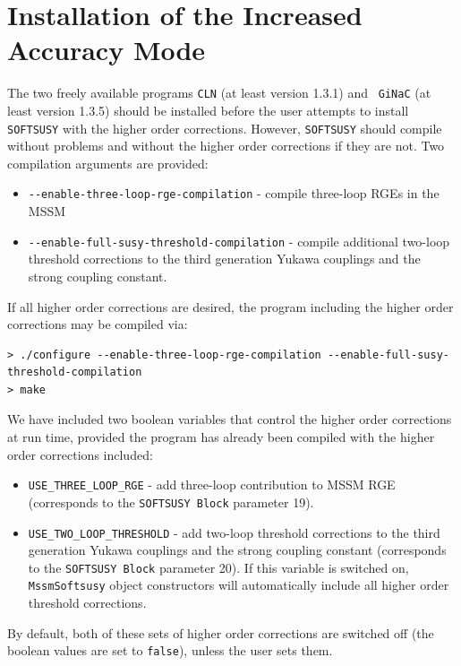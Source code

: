 \documentclass[final,3p,times,pdflatex]{elsarticle}
\def\code#1{\small{\tt #1}\normalsize}
\begin{document}
\appendix

\section{Installation of the Increased Accuracy Mode}
\label{sec:install}

The two freely available programs {\tt CLN} (at least version 1.3.1) and {\tt
  GiNaC} (at least version 1.3.5) should be installed before the user attempts
to install {\tt SOFTSUSY} with the higher order corrections. However, 
{\tt SOFTSUSY} should compile without problems and without the higher order
corrections if they are not. 
Two compilation arguments are provided:
\small\begin{itemize}
	\item[] \verb|--enable-three-loop-rge-compilation| - compile three-loop RGEs in the MSSM 
	\item[] \verb|--enable-full-susy-threshold-compilation| - compile
          additional two-loop threshold corrections to the third generation
          Yukawa couplings and the strong coupling constant.
\end{itemize}\normalsize
If all higher order corrections are desired, the program including the higher
order corrections may be compiled via:
\begin{verbatim}
> ./configure --enable-three-loop-rge-compilation --enable-full-susy-threshold-compilation
> make
\end{verbatim}

We have included two boolean variables that control the higher order
corrections  at run time, provided the program has already been compiled with 
the higher order corrections included:
\begin{itemize}
	\item \verb|USE_THREE_LOOP_RGE|  - add three-loop contribution to
          MSSM RGE (corresponds to the \code{SOFTSUSY Block} parameter 19). 
	\item \verb|USE_TWO_LOOP_THRESHOLD| - add two-loop threshold
          corrections to the third generation Yukawa couplings and the strong
          coupling constant 
          (corresponds to the \code{SOFTSUSY Block} parameter 20). If this
          variable is switched on, {\tt MssmSoftsusy} object constructors will 
          automatically include all higher order threshold corrections. 
\end{itemize}
By default, both of these sets of higher order corrections are switched off 
(the boolean values are set to {\tt false}), unless the user sets them. 
\end{document}
